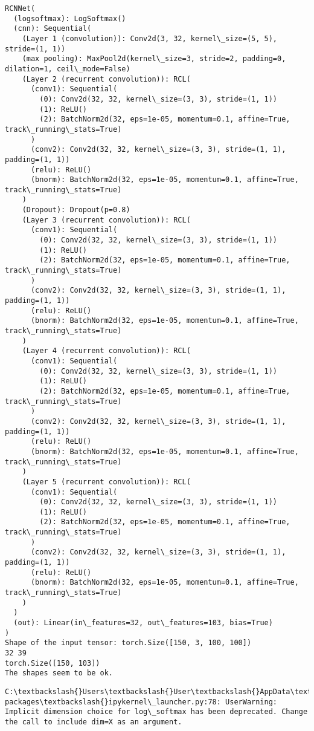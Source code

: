 \documentclass[11pt]{article}
\begin{document}
    \begin{Verbatim}[commandchars=\\\{\}]
RCNNet(
  (logsoftmax): LogSoftmax()
  (cnn): Sequential(
    (Layer 1 (convolution)): Conv2d(3, 32, kernel\_size=(5, 5), stride=(1, 1))
    (max pooling): MaxPool2d(kernel\_size=3, stride=2, padding=0, dilation=1, ceil\_mode=False)
    (Layer 2 (recurrent convolution)): RCL(
      (conv1): Sequential(
        (0): Conv2d(32, 32, kernel\_size=(3, 3), stride=(1, 1))
        (1): ReLU()
        (2): BatchNorm2d(32, eps=1e-05, momentum=0.1, affine=True, track\_running\_stats=True)
      )
      (conv2): Conv2d(32, 32, kernel\_size=(3, 3), stride=(1, 1), padding=(1, 1))
      (relu): ReLU()
      (bnorm): BatchNorm2d(32, eps=1e-05, momentum=0.1, affine=True, track\_running\_stats=True)
    )
    (Dropout): Dropout(p=0.8)
    (Layer 3 (recurrent convolution)): RCL(
      (conv1): Sequential(
        (0): Conv2d(32, 32, kernel\_size=(3, 3), stride=(1, 1))
        (1): ReLU()
        (2): BatchNorm2d(32, eps=1e-05, momentum=0.1, affine=True, track\_running\_stats=True)
      )
      (conv2): Conv2d(32, 32, kernel\_size=(3, 3), stride=(1, 1), padding=(1, 1))
      (relu): ReLU()
      (bnorm): BatchNorm2d(32, eps=1e-05, momentum=0.1, affine=True, track\_running\_stats=True)
    )
    (Layer 4 (recurrent convolution)): RCL(
      (conv1): Sequential(
        (0): Conv2d(32, 32, kernel\_size=(3, 3), stride=(1, 1))
        (1): ReLU()
        (2): BatchNorm2d(32, eps=1e-05, momentum=0.1, affine=True, track\_running\_stats=True)
      )
      (conv2): Conv2d(32, 32, kernel\_size=(3, 3), stride=(1, 1), padding=(1, 1))
      (relu): ReLU()
      (bnorm): BatchNorm2d(32, eps=1e-05, momentum=0.1, affine=True, track\_running\_stats=True)
    )
    (Layer 5 (recurrent convolution)): RCL(
      (conv1): Sequential(
        (0): Conv2d(32, 32, kernel\_size=(3, 3), stride=(1, 1))
        (1): ReLU()
        (2): BatchNorm2d(32, eps=1e-05, momentum=0.1, affine=True, track\_running\_stats=True)
      )
      (conv2): Conv2d(32, 32, kernel\_size=(3, 3), stride=(1, 1), padding=(1, 1))
      (relu): ReLU()
      (bnorm): BatchNorm2d(32, eps=1e-05, momentum=0.1, affine=True, track\_running\_stats=True)
    )
  )
  (out): Linear(in\_features=32, out\_features=103, bias=True)
)
Shape of the input tensor: torch.Size([150, 3, 100, 100])
32 39
torch.Size([150, 103])
The shapes seem to be ok.

    \end{Verbatim}

    \begin{Verbatim}[commandchars=\\\{\}]
C:\textbackslash{}Users\textbackslash{}User\textbackslash{}AppData\textbackslash{}Local\textbackslash{}conda\textbackslash{}conda\textbackslash{}envs\textbackslash{}dle\textbackslash{}lib\textbackslash{}site-packages\textbackslash{}ipykernel\_launcher.py:78: UserWarning: Implicit dimension choice for log\_softmax has been deprecated. Change the call to include dim=X as an argument.

    \end{Verbatim}
\end{document}
